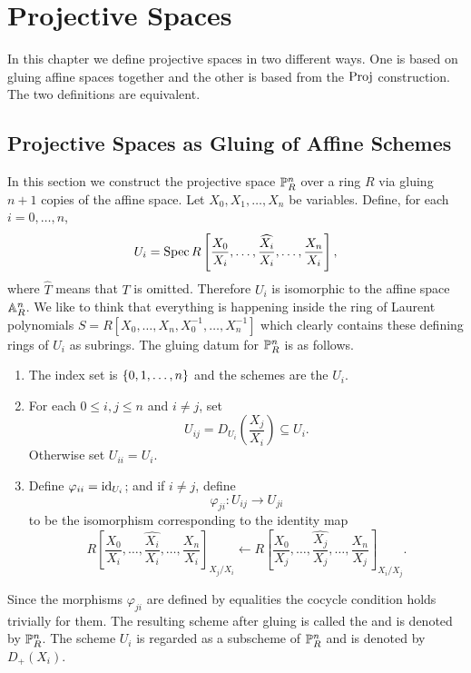 	\chapter{Projective Spaces}

In this chapter we define projective spaces in two different ways. One is based on gluing affine spaces together and the other is based from the $\operatorname{Proj}$ construction. The two definitions are equivalent.

\section{Projective Spaces as Gluing of Affine Schemes}

In this section we construct the projective space $\mathbb P^n_R$ over a ring $R$ via gluing $n + 1$ copies of the affine space. Let $X_0, X_1, \dotsc, X_n$ be variables. Define, for each $i = 0, \dotsc, n$,
\begin{equation*}
	U_i = \operatorname{Spec} R\left[\frac{X_0}{X_i}, \dotsc, \widehat{\frac{X_i}{X_i}}, \dotsc, \frac{X_n}{X_i}\right],
\end{equation*}
where $\widehat{T}$ means that $T$ is omitted. Therefore $U_i$ is isomorphic to the affine space $\mathbb A^n_R$. We like to think that everything is happening inside the ring of Laurent polynomials $S = R[X_0, \dotsc, X_n, X_0^{-1}, \dotsc, X_n^{-1}]$ which clearly contains these defining rings of $U_i$ as subrings. The gluing datum for $\mathbb P^n_R$ is as follows.
\begin{enumerate}
	\item The index set is $\lbrace0, 1, \dotsc, n\rbrace$ and the schemes are the $U_i$.
	\item For each $0 \leq i, j \leq n$ and $i \neq j$, set
	\begin{equation*}
		U_{ij} = D_{U_i}\left(\frac{X_j}{X_i}\right) \subseteq U_i.
	\end{equation*}
	Otherwise set $U_{ii} = U_i$.
	
	\item Define $\varphi_{ii} = \operatorname{id}_{U_i}$; and if $i \neq j$, define
	\begin{equation*}
		\varphi_{ji} \colon U_{ij} \to U_{ji}
	\end{equation*}
	to be the isomorphism corresponding to the identity map
	\begin{equation*}
		R\left[\frac{X_0}{X_i}, \dotsc, \widehat{\frac{X_i}{X_i}}, \dotsc, \frac{X_n}{X_i}\right]_{X_j/X_i} \leftarrow R\left[\frac{X_0}{X_j}, \dotsc, \widehat{\frac{X_j}{X_j}}, \dotsc, \frac{X_n}{X_j}\right]_{X_i/X_j}.
	\end{equation*}
\end{enumerate}
Since the morphisms $\varphi_{ji}$ are defined by equalities the cocycle condition holds trivially for them. The resulting scheme after gluing is called the  and is denoted by $\mathbb P^n_R$. The scheme $U_i$ is regarded as a subscheme of $\mathbb P^n_R$ and is denoted by $D_+(X_i)$.

